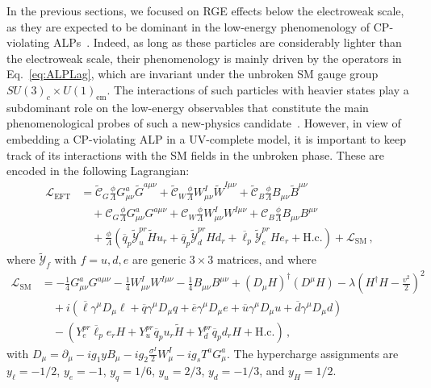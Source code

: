 In the previous sections, we focused on RGE effects below the electroweak scale, as they are
expected to be dominant in the low-energy phenomenology of CP-violating
ALPs~\cite{Marciano:2016yhf,DiLuzio:2020oah}.
Indeed, as long as these particles are considerably lighter than the electroweak scale, their
phenomenology is mainly driven by the operators in Eq.~\eqref{eq:ALPLag}, which are invariant
under the unbroken SM gauge group $SU(3)_c\times U(1)_\text{em}$.
The interactions of such particles with heavier states play a subdominant role on the
low-energy observables that constitute the main phenomenological probes of such a new-physics
candidate~\cite{DiLuzio:2020oah,DiLuzio:2023cuk}.
However, in view of embedding a CP-violating ALP in a UV-complete model, it is important to
keep track of its interactions with the SM fields in the unbroken phase.
These are encoded in the following Lagrangian:
\begin{align}
\mathcal{L}_\text{EFT} &= \widetilde{\mathcal{C}}_{G}\frac{\phi}{\Lambda} G_{\mu\nu}^a\widetilde{G}^{a\mu\nu} + \widetilde{\mathcal{C}}_{W}\frac{\phi}{\Lambda} W^I_{\mu\nu}\widetilde{W}^{I\mu\nu}+ \widetilde{\mathcal{C}}_{B}\frac{\phi}{\Lambda} B_{\mu\nu}\widetilde{B}^{\mu\nu}\nonumber \\
&\quad + \mathcal{C}_{G}\frac{\phi}{\Lambda} G_{\mu\nu}^aG^{a\mu\nu} + \mathcal{C}_{W}\frac{\phi}{\Lambda} W_{\mu\nu}^I W^{I\mu\nu}+ \mathcal{C}_{B}\frac{\phi}{\Lambda} B_{\mu\nu}B^{\mu\nu} \nonumber \\
&\quad + \frac{\phi}{\Lambda} \left(\overline{q}_p\widetilde{\mathcal{Y}}^{pr}_u\widetilde{H}u_r+ \overline{q}_p\widetilde{\mathcal{Y}}^{pr}_d H d_r+ \overline{\ell}_p\widetilde{\mathcal{Y}}^{pr}_e He_r + \text{H.c.}\right) + \mathcal{L}_{\text{SM}}\,,
\label{eq:ALPSMEFTLag}
\end{align}
where $\widetilde{\mathcal{Y}}_{f}$ with $f = u,d,e$ are generic $3 \times 3$ matrices, and
where
\begin{align}
\mathcal{L}_\text{SM} &= -\frac{1}{4}G_{\mu\nu}^aG^{a\mu\nu}-\frac{1}{4}W_{\mu\nu}^IW^{I\mu\nu}-\frac{1}{4}B_{\mu\nu}B^{\mu\nu}+(D_\mu H)^\dagger (D^\mu H)-\lambda \left(H^\dagger H-\frac{v^2}{2}\right)^2 \nonumber \\
&\quad + i \left(\overline \ell \gamma^\mu D_\mu \ell + \overline q \gamma^\mu D_\mu q + \overline e \gamma^\mu D_\mu e + \overline u \gamma^\mu D_\mu u + \overline d \gamma^\mu D_\mu d\right) \nonumber \\
&\quad - \left(Y_e^{pr} \overline \ell_p e_r H + Y_u^{pr} \overline q_p u_r \widetilde H + Y_d^{pr} \overline q_p d_r H + \text{H.c.}\right)\,,
\end{align}
with
$D_\mu = \partial_\mu - i g_1 y B_\mu - i g_2 \frac{\sigma^I}{2}W_\mu^I-i g_s T^a G^a_\mu$.
The hypercharge assignments are $y_\ell = -1/2$, $y_e = -1$, $y_q=1/6$, $y_u=2/3$,
$y_d = -1/3$, and $y_H = 1/2$.

